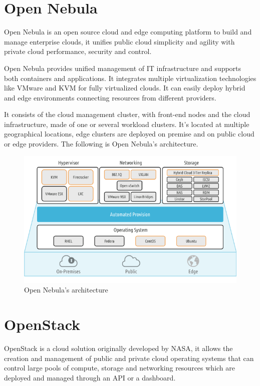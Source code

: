\section{Open Nebula}
Open Nebula is an open source cloud and edge computing platform to build and manage enterprise clouds, it unifies public cloud simplicity and agility with private cloud performance, security and control.

Open Nebula provides unified management of IT infrastructure and supports both containers and applications. It integrates multiple virtualization technologies like VMware and KVM for fully virtualized clouds. It can easily deploy hybrid and edge environments connecting resources from different providers.

It consists of the cloud management cluster, with front-end nodes and the cloud infrastructure, made of one or several workload clusters. It's located at multiple geographical locations, edge clusters are deployed on premise and on public cloud or edge providers. The following is Open Nebula's architecture.
\begin{figure}
    \centering
    \includegraphics[scale=0.6]{img/Open_Nebula.png}
    \caption{Open Nebula's architecture}
\end{figure}

\section{OpenStack}
OpenStack is a cloud solution originally developed by NASA, it allows the creation and management of
public and private cloud operating systems that can control large pools of compute, storage and networking resources which are deployed and managed through an API or a dashboard.

